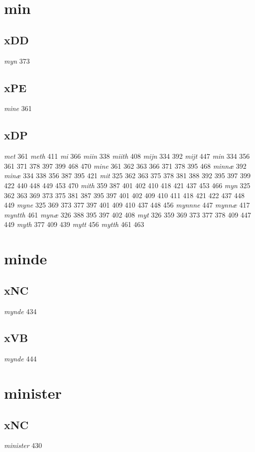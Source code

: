 \documentclass[a4paper,twocolumn]{article}
\begin{document}
\section{min}
\label{sec:org2049ca6}
\subsection{xDD}
\label{sec:org4dfdaa0}
\emph{myn} 373 
\subsection{xPE}
\label{sec:orga6a718d}
\emph{mine} 361 
\subsection{xDP}
\label{sec:org343c4b0}
\emph{met} 361 \emph{meth} 411 \emph{mi} 366 \emph{miin} 338 \emph{miith} 408 \emph{mijn} 334 392 \emph{mijt} 447 \emph{min} 334 356 361 371 378 397 399 468 470 \emph{mine} 361 362 363 366 371 378 395 468 \emph{minnæ} 392 \emph{minæ} 334 338 356 387 395 421 \emph{mit} 325 362 363 375 378 381 388 392 395 397 399 422 440 448 449 453 470 \emph{mith} 359 387 401 402 410 418 421 437 453 466 \emph{myn} 325 362 363 369 373 375 381 387 395 397 401 402 409 410 411 418 421 422 437 448 449 \emph{myne} 325 369 373 377 397 401 409 410 437 448 456 \emph{mynnne} 447 \emph{mynnæ} 417 \emph{myntth} 461 \emph{mynæ} 326 388 395 397 402 408 \emph{myt} 326 359 369 373 377 378 409 447 449 \emph{myth} 377 409 439 \emph{mytt} 456 \emph{mytth} 461 463 
\section{minde}
\label{sec:org878707a}
\subsection{xNC}
\label{sec:orgd23001f}
\emph{mynde} 434 
\subsection{xVB}
\label{sec:org96fd975}
\emph{mynde} 444 
\section{minister}
\label{sec:org36db935}
\subsection{xNC}
\label{sec:org3a2b05b}
\emph{minister} 430 
\end{document}

